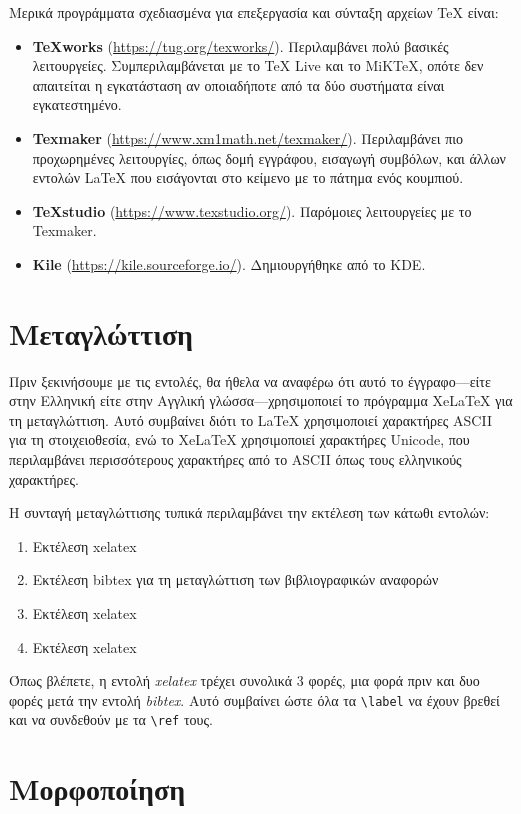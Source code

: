 \documentclass[inscr,ack,preface]{dimscthesis}
\begin{document}
Μερικά προγράμματα σχεδιασμένα για επεξεργασία και σύνταξη αρχείων \TeX{} είναι:
\begin{itemize}
    \item \textbf{TeXworks} (\url{https://tug.org/texworks/}).
    Περιλαμβάνει πολύ βασικές λειτουργείες.
    Συμπεριλαμβάνεται με το TeX Live και το MiKTeX, οπότε δεν απαιτείται η εγκατάσταση αν οποιαδήποτε από τα δύο συστήματα είναι εγκατεστημένο.
    \item \textbf{Texmaker} (\url{https://www.xm1math.net/texmaker/}).
    Περιλαμβάνει πιο προχωρημένες λειτουργίες, όπως δομή εγγράφου, εισαγωγή συμβόλων, και άλλων εντολών \LaTeX{} που εισάγονται στο κείμενο με το πάτημα ενός κουμπιού.
    \item \textbf{TeXstudio} (\url{https://www.texstudio.org/}).
    Παρόμοιες λειτουργείες με το Texmaker.
    \item \textbf{Kile} (\url{https://kile.sourceforge.io/}).
    Δημιουργήθηκε από το KDE.
\end{itemize}

\section{Μεταγλώττιση} \label{compiling}

Πριν ξεκινήσουμε με τις εντολές, θα ήθελα να αναφέρω ότι αυτό το έγγραφο---είτε στην Ελληνική είτε στην Αγγλική γλώσσα---χρησιμοποιεί το πρόγραμμα XeLaTeX για τη μεταγλώττιση.
Αυτό συμβαίνει διότι το LaTeX χρησιμοποιεί χαρακτήρες ASCII για τη στοιχειοθεσία, ενώ το XeLaTeX χρησιμοποιεί χαρακτήρες Unicode, που περιλαμβάνει περισσότερους χαρακτήρες από το ASCII όπως τους ελληνικούς χαρακτήρες.

Η συνταγή μεταγλώττισης τυπικά περιλαμβάνει την εκτέλεση των κάτωθι εντολών:
\begin{enumerate}
    \item Εκτέλεση xelatex
    \item Εκτέλεση bibtex για τη μεταγλώττιση των βιβλιογραφικών αναφορών
    \item Εκτέλεση xelatex
    \item Εκτέλεση xelatex
\end{enumerate}

Όπως βλέπετε, η εντολή \textit{xelatex} τρέχει συνολικά 3 φορές, μια φορά πριν και δυο φορές μετά την εντολή \textit{bibtex}.
Αυτό συμβαίνει ώστε όλα τα \verb|\label| να έχουν βρεθεί και να συνδεθούν με τα \verb|\ref| τους.

\section{Μορφοποίηση} \label{formatting}
\end{document}
